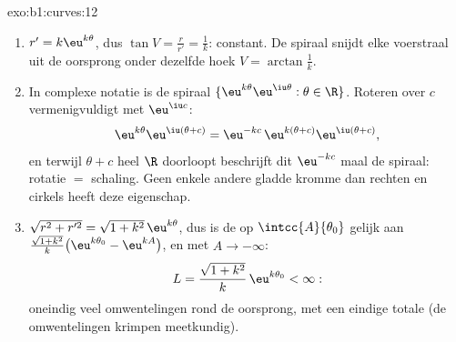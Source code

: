 \begin{solution}{exo:b1:curves:12}
\begin{enumerate}
  \item $r' = k\eu^{k\theta}$, dus $\tan V = \frac{r}{r'} =
        \frac1k$: constant. De spiraal snijdt elke voerstraal uit de
        oorsprong onder dezelfde hoek $V = \arctan\frac1k$.
  \item In complexe notatie is de spiraal $\{\eu^{k\theta}
        \eu^{\iu\theta} : \theta \in \R\}$. Roteren over $c$
        vermenigvuldigt met $\eu^{\iu c}$:
        \[
        \eu^{k\theta}\eu^{\iu(\theta + c)}
        = \eu^{-kc}\,\eu^{k(\theta + c)}\eu^{\iu(\theta+c)} ,
        \]
        en terwijl $\theta + c$ heel $\R$ doorloopt beschrijft dit
        $\eu^{-kc}$ maal de spiraal: rotatie $=$ schaling. Geen
        enkele andere gladde kromme dan rechten en cirkels heeft
        deze eigenschap.
  \item $\sqrt{r^2 + r'^2} = \sqrt{1 + k^2}\,\eu^{k\theta}$, dus is
        de  op $\intcc{A}{\theta_0}$ gelijk aan
        $\frac{\sqrt{1+k^2}}{k}\bigl(\eu^{k\theta_0} -
        \eu^{kA}\bigr)$, en met $A \to -\infty$:
        \[
        L = \frac{\sqrt{1 + k^2}}{k}\,\eu^{k\theta_0} < \infty :
        \]
        oneindig veel omwentelingen rond de oorsprong, met een
        eindige totale  (de omwentelingen krimpen
        meetkundig).
\end{enumerate}
\end{solution}

